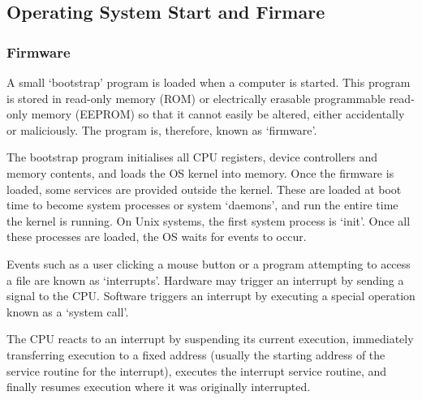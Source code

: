 \subsection{Operating System Start and Firmare}

\subsubsection{Firmware}

A small `bootstrap' program is loaded when a computer is started.
This program is stored in read-only memory (ROM) or electrically erasable programmable read-only memory (EEPROM) so that it cannot easily be altered, either accidentally or maliciously.
The program is, therefore, known as `firmware'.

The bootstrap program initialises all CPU registers, device controllers and memory contents, and loads the OS kernel into memory.
Once the firmware is loaded, some services are provided outside the kernel.
These are loaded at boot time to become system processes or system `daemons', and run the entire time the kernel is running.
On Unix systems, the first system process is `init'.
Once all these processes are loaded, the OS waits for events to occur.

Events such as a user clicking a mouse button or a program attempting to access a file are known as `interrupts'.
Hardware may trigger an interrupt by sending a signal to the CPU\@.
Software triggers an interrupt by executing a special operation known as a `system call'.

The CPU reacts to an interrupt by suspending its current execution, immediately transferring execution to a fixed address (usually the starting address of the service routine for the interrupt), executes the interrupt service routine, and finally resumes execution where it was originally interrupted.